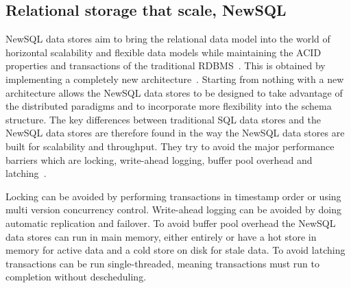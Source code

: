 %
%
%
%

\subsection{Relational storage that scale, NewSQL}
\label{sec:newsql}
NewSQL data stores aim to bring the relational data model into the world of horizontal scalability and flexible data models while maintaining the ACID properties and transactions of the traditional RDBMS~\cite{Cattell:ScalableSQLAndNoSQLDataStores}.
This is obtained by implementing a completely new architecture~\cite{CORBETT:SpannerGooglesGloballyDistributedDatabase}.
Starting from nothing with a new architecture allows the NewSQL data stores to be designed to take advantage of the distributed paradigms and to incorporate more flexibility into the schema structure.
The key differences between traditional SQL data stores and the NewSQL data stores are therefore found in the way the NewSQL data stores are built for scalability and throughput.
They try to avoid the major performance barriers which are locking, write-ahead logging, buffer pool overhead and latching~\cite{Stonebraker:NewSQLvsNoSQLForNewOLTP}.

Locking can be avoided by performing transactions in timestamp order or using multi version concurrency control.
Write-ahead logging can be avoided by doing automatic replication and failover.
To avoid buffer pool overhead the NewSQL data stores can run in main memory, either entirely or have a hot store in memory for active data and a cold store on disk for stale data.
To avoid latching transactions can be run single-threaded, meaning transactions must run to completion without descheduling.

